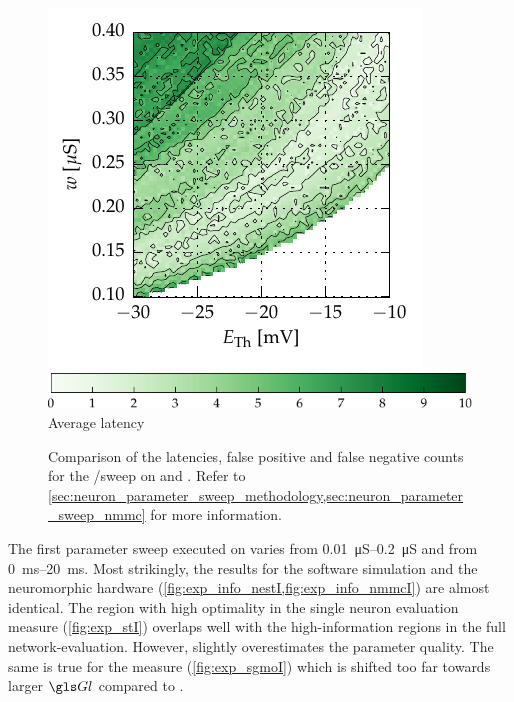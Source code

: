 \begin{figure}[p]
{		\includegraphics[trim=7mm 3mm 2mm 2.2mm,clip]{media/chp5/nmmc/plot_1_lat_avg_2d_spiNNaker_small.pdf}%
		\label{fig:exp_lat_nmmc}
	}
	\hspace*{7.5mm}\includegraphics{media/chp5/colorbar_lat1.pdf}
	{\footnotesize Average latency \latency [\si{\milli\second}]}
	\caption[NM-MC1 and NEST errors and latencies]{Comparison of the latencies, false positive and false negative counts for the \ETh/\wsyn sweep on \NEST and \NMMC. Refer to \cref{sec:neuron_parameter_sweep_methodology,sec:neuron_parameter_sweep_nmmc} for more information.}
	\label{fig:exp_sweepIIb}
\end{figure}

The first parameter sweep executed on \NMMC varies \Gl from \SIrange{0.01}{0.2}{\micro\siemens} and \TauE from \SIrange{0}{20}{\milli\second}. Most strikingly, the results for the \NEST software simulation and the \NMMC neuromorphic hardware (\cref{fig:exp_info_nestI,fig:exp_info_nmmcI}) are almost identical. The region with high optimality in the \STII single neuron evaluation measure (\cref{fig:exp_stI}) overlaps well with the high-information regions in the full network-evaluation. However, \STII slightly overestimates the parameter quality. The same is true for the \SGMO measure (\cref{fig:exp_sgmoI}) which is shifted too far towards larger $\Gl$ compared to \STII.

